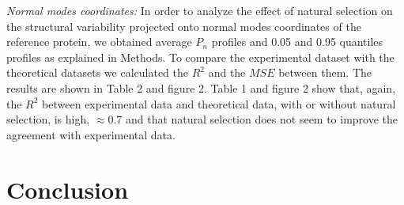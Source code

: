 \documentclass{article}
\begin{document}
\begin{multicols}{2}
{\it Normal modes coordinates:}
In order to analyze the effect of natural selection on the structural variability projected onto normal modes coordinates of the reference protein, we obtained average $P_{n}$ profiles and 0.05 and 0.95 quantiles profiles as explained in Methods. To compare the experimental dataset with the theoretical datasets we calculated the $R^2$ and the $MSE$ between them. The results are shown in Table 2 and figure 2. Table 1 and figure 2 show that, again, the $R^2$ between experimental data and theoretical data, with or without natural selection, is high, $\approx 0.7$ and that natural selection does not seem to improve the agreement with experimental data. 


\section{Conclusion}
\end{multicols} 
\end{document}
